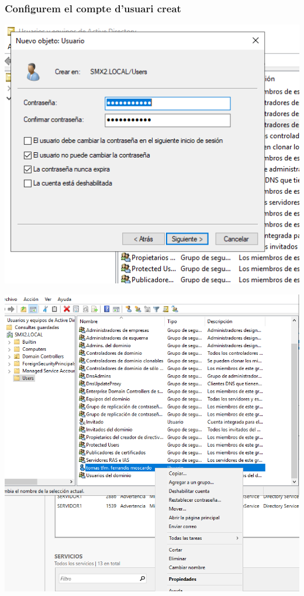 \documentclass[
  a4paper,
]{article}
\begin{document}
\subsubsection{Configurem el compte d'usuari
creat}\label{configurem-el-compte-dusuari-creat}

\includegraphics{png/usuaris5.png}

\includegraphics{png/usuaris6.png}
\end{document}
